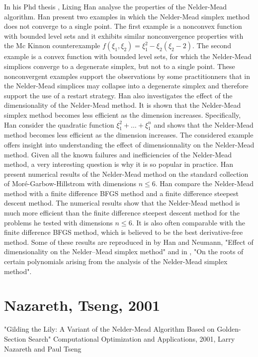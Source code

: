 In his Phd thesis \cite{Han2000}, Lixing Han analyse the 
properties of the Nelder-Mead algorithm.
Han present two examples in which the Nelder-Mead 
simplex method does not converge to a single point. 
The first example is a nonconvex function with bounded 
level sets and it exhibits similar nonconvergence properties 
with the Mc Kinnon counterexample $f(\xi_1,\xi_2) = \xi_1^2 - \xi_2(\xi_2-2)$. 
The second example is a convex function with bounded level sets, for 
which the Nelder-Mead simplices converge to a degenerate simplex, but 
not to a single point. These nonconvergent examples support the 
observations by some practitionners that in the Nelder-Mead 
simplices may collapse into a degenerate simplex and therefore support 
the use of a restart strategy. Han also investigates 
the effect of the dimensionality of the Nelder-Mead method.
It is shown that the Nelder-Mead simplex method becomes less
efficient as the dimension increases. Specifically, Han consider the quadratic
function $\xi_1^2 + \ldots + \xi_1^n$ and shows that the Nelder-Mead 
method becomes less efficient as the dimension increases.
The considered example offers insight into understanding the effect
of dimensionnality on the Nelder-Mead method.
Given all the known failures and inefficiencies of the Nelder-Mead 
method, a very interesting question is why it is so popular in practice.
Han present numerical results of the Nelder-Mead method on the standard
collection of Moré-Garbow-Hillstrom with dimensions $n\leq 6$.
Han compare the Nelder-Mead method with a finite difference BFGS 
method and a finite difference steepest descent method. The numerical
results show that the Nelder-Mead method is much more efficient 
than the finite difference steepest descent method for the problems he
tested with dimensions $n\leq 6$. It is also often comparable with the 
finite difference BFGS method, which is believed to be the 
best derivative-free method.
Some of these results are reproduced in \cite{HanNeumann2006} by Han and Neumann, 
"Effect of dimensionality on the Nelder–Mead simplex method"
and in \cite{hanNeumann2003}, "On the roots of certain polynomials arising 
from the analysis of the Nelder-Mead simplex method".

\section{Nazareth, Tseng, 2001}

"Gilding the Lily: A Variant of the Nelder-Mead Algorithm Based on Golden-Section Search"
Computational Optimization and Applications, 2001, 
Larry Nazareth and Paul Tseng

